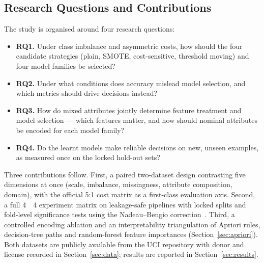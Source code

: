 \subsection{Research Questions and Contributions}
The study is organised around four research questions:
\begin{itemize}
  \item \textbf{RQ1.} Under class imbalance and asymmetric costs, how
  should the four candidate strategies (plain, SMOTE, cost-sensitive, threshold
  moving) and four model families be selected?
  \item \textbf{RQ2.} Under what conditions does accuracy mislead model
  selection, and which metrics should drive decisions instead?
  \item \textbf{RQ3.} How do mixed attributes jointly determine feature
  treatment and model selection --- which features matter, and how should nominal
  attributes be encoded for each model family?
  \item \textbf{RQ4.} Do the learnt models make reliable decisions on new,
  unseen examples, as measured once on the locked hold-out sets?
\end{itemize}

Three contributions follow. First, a paired two-dataset design contrasting five
dimensions at once (scale, imbalance, missingness, attribute composition, domain),
with the official 5:1 cost matrix as a first-class evaluation axis. Second, a
full 4~\times~4 experiment matrix on leakage-safe pipelines with locked
splits and fold-level significance tests using the Nadeau--Bengio
correction~\cite{nadeau2003inference,demsar2006comparison}. Third, a
controlled encoding ablation and an interpretability triangulation of Apriori
rules, decision-tree paths and random-forest feature importances
(Section~\ref{sec:apriori}). Both datasets are publicly available from the
UCI repository with donor and license recorded in
Section~\ref{sec:data}; results are reported in Section~\ref{sec:results}.
